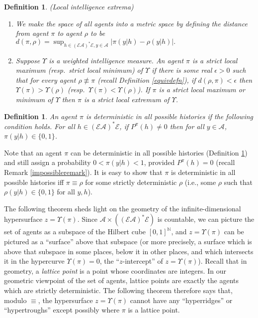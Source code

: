 \documentclass[twoside]{article}
\newtheorem{definition}[theorem]{Definition}
\begin{document}
\begin{definition}
    (Local intelligence extrema)
    \begin{enumerate}
    \item
        We make the space of all agents into a metric space by defining
        the distance from agent $\pi$
        to agent $\rho$ to be
        $
            d(\pi,\rho)
            =
            \sup_{h\in(\mathcal E\mathcal A)^*\mathcal E,y\in\mathcal A}\left|
                \pi(y|h) - \rho(y|h)
            \right|.
        $
    \item
        Suppose $\Upsilon$ is a weighted intelligence measure. An agent $\pi$
        is a \emph{strict local maximum} (resp.\ \emph{strict local minimum})
        of $\Upsilon$ if there is some real $\epsilon>0$
        such that for every agent $\rho\not\equiv\pi$
        (recall Definition \ref{equivdefn}), if $d(\rho,\pi)<\epsilon$
        then $\Upsilon(\pi)>\Upsilon(\rho)$ (resp.\ $\Upsilon(\pi)<\Upsilon(\rho)$).
        If $\pi$ is a strict local maximum or minimum of $\Upsilon$ then
        $\pi$ is a \emph{strict local extremum} of $\Upsilon$.
    \end{enumerate}
\end{definition}

\begin{definition}
\label{deterministicinpracticedefn}
    An agent $\pi$ is \emph{deterministic in all possible histories}
    if the following condition
    holds. For all $h\in(\mathcal E\mathcal A)^*\mathcal E$,
    if $P^\pi(h)\not=0$ then for all $y\in\mathcal A$,
    $\pi(y|h)\in\{0,1\}$.
\end{definition}

Note that an agent $\pi$ can be deterministic in all possible histories
(Definition \ref{deterministicinpracticedefn}) and still assign a
probability $0<\pi(y|h)<1$, provided $P^\pi(h)=0$ (recall Remark \ref{impossibleremark}).
It is easy to show that $\pi$ is deterministic in all possible histories iff $\pi\equiv\rho$
for some strictly
deterministic $\rho$ (i.e., some $\rho$ such that $\rho(y|h)\in\{0,1\}$ for
all $y,h$).

The following theorem sheds light on the geometry of the infinite-dimensional hypersurface
$z=\Upsilon(\pi)$. Since $\mathcal A\times((\mathcal E\mathcal A)^*\mathcal E)$ is
countable, we can picture the set of agents as a subspace of the Hilbert cube
$[0,1]^{\mathbb N}$, and $z=\Upsilon(\pi)$ can be pictured as a ``surface'' above
that subspace (or more precisely, a surface which is above that subspace in some places,
below it in other places, and which intersects it in the hypercurve $\Upsilon(\pi)=0$,
the ``$z$-intercept'' of $z=\Upsilon(\pi)$). Recall that in geometry, a \emph{lattice point}
is a point whose coordinates are integers. In our geometric viewpoint of the set of
agents, lattice points are exactly the agents which are strictly deterministic. The following
theorem therefore says that, modulo $\equiv$, the hypersurface $z=\Upsilon(\pi)$
cannot have any ``hyperridges'' or ``hypertroughs'' except possibly
where $\pi$ is a lattice point.
\end{document}
